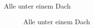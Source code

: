 \documentclass[
  letterpaper,
  DIV=11,
  numbers=noendperiod]{scrartcl}
\makeatletter
\let\oldparagraph\paragraph
\renewcommand{\paragraph}{
    \@ifstar
      \xxxParagraphStar
      \xxxParagraphNoStar
  }
\newcommand{\xxxParagraphStar}[1]{\oldparagraph*{#1}\mbox{}}
\newcommand{\xxxParagraphNoStar}[1]{\oldparagraph{#1}\mbox{}}
\makeatother
\begin{document}
\paragraph{Alle unter einem Dach}\label{alle-unter-einem-dach}

\begin{figure}


\caption{\label{fig-alle-unter-einem-dach}Alle unter einem Dach}

\end{figure}%
\end{document}
